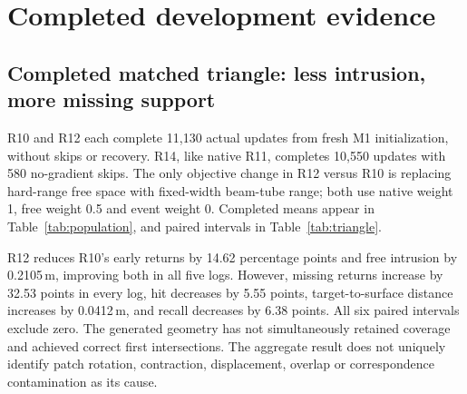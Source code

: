 \documentclass[10pt,a4paper]{article}
\begin{document}
\section{Completed development evidence}
\begin{table}[htbp]
\centering\small

\caption{Completed candidates, all 75 development entries in five logs.
Recall is measured-target-to-surface recall, not complete-surface recall.
Empty predictions remain missing. Short/long labels, adaptation budgets and
output representations differ as described in the text; no row is a final
confirmed method. Late rates are the residual outcome and are omitted for space.}
\label{tab:population}
\end{table}

\subsection{Completed matched triangle: less intrusion, more missing support}
R10 and R12 each complete 11,130 actual updates from fresh M1 initialization,
without skips or recovery. R14, like native R11, completes 10,550 updates with
580 no-gradient skips. The only objective change in R12 versus R10 is replacing
hard-range free space with fixed-width beam-tube range; both use native weight
1, free weight 0.5 and event weight 0. Completed means appear in
Table~\ref{tab:population}, and paired intervals in Table~\ref{tab:triangle}.

R12 reduces R10's early returns by 14.62 percentage points and free intrusion
by 0.2105\,m, improving both in all five logs. However, missing returns increase
by 32.53 points in every log, hit decreases by 5.55 points, target-to-surface
distance increases by 0.0412\,m, and recall decreases by 6.38 points. All six
paired intervals exclude zero. The generated geometry has not simultaneously
retained coverage and achieved correct first intersections. The aggregate
result does not uniquely identify patch rotation, contraction, displacement,
overlap or correspondence contamination as its cause.

\begin{table}[htbp]
\centering\small

\caption{Completed R12 differences on all 75 development Actors in five logs.
R10 differs in free objective; R14 differs in native versus Query surface
generation, and R8 in the LiDAR versus visual/native path. The latter two
are pathway comparisons, not attention-only ablations. Values reuse saved
10,000-resample paired intervals, without rerunning inference or bootstrap.}
\label{tab:triangle}
\end{table}
\end{document}
